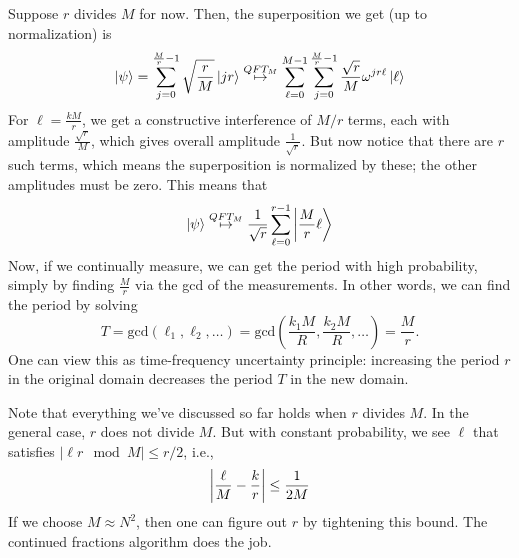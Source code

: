 Suppose $r$ divides $M$ for now. Then, the superposition we get (up to normalization) is
\[ \ket{\psi} = \sum_{j = 0}^{\frac{M}{r} - 1} \sqrt{\frac{r}{M}}\ket{jr} \overset{QFT_M}{\mapsto} \sum_{\ell = 0}^{M - 1} \sum_{j = 0}^{\frac{M}{r} - 1} \frac{\sqrt{r}}{M} \omega^{jr\ell} \ket{\ell} \]
For $\ell = \frac{k M}{r}$, we get a constructive interference of $M/r$ terms, each with amplitude $\frac{\sqrt{r}}{M}$, which gives overall amplitude
$\frac{1}{\sqrt{r}}$. But now notice that there are $r$ such terms, which means the superposition is normalized by these; the other amplitudes must be zero.
This means that 
\[ \ket{\psi} \overset{QFT_M}{\mapsto} \frac{1}{\sqrt{r}} \sum_{\ell = 0}^{r - 1} \ket{\frac{M}{r}\ell}\]
Now, if we continually measure, we can get the period with high probability, simply by finding $\frac{M}{r}$ via the gcd of the measurements. %
In other words, we can find the period by solving
\[T = \mathrm{gcd}\left(\ell_1, \ell_2, \dots\right) = \mathrm{gcd} \left(\frac{k_1 M}{R}, \frac{k_2 M}{R}, \dots\right) = \frac{M}{r}.\]
One can view this as time-frequency uncertainty principle: increasing the period $r$ in the original domain decreases the period $T$ in the new domain.

Note that everything we've discussed so far holds when $r$ divides $M$. In the general case, $r$ does not divide $M$. But with constant probability, we see $\ell$ that satisfies $|\ell r \mod M| \leq r/2$, i.e.,
\[ \qty|\frac{\ell}{M} - \frac{k}{r}| \leq \frac{1}{2M} \]
If we choose $M \approx N^2$, then one can figure out $r$ by tightening this bound. The continued fractions algorithm does the job.